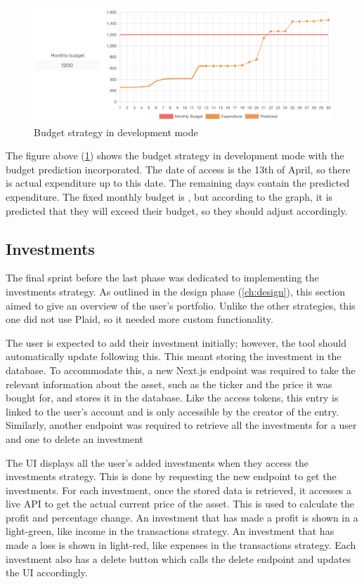 \begin{figure}[H]
	\centering
	\includegraphics[width=\textwidth]{images/Budget_strategy.png}
	\caption{Budget strategy in development mode}
	\label{fig:BudgetStrategy}
\end{figure}

The figure above (\ref{fig:BudgetStrategy}) shows the budget strategy in development mode with the budget prediction incorporated. The date of access is the 13th of April, so there is actual expenditure up to this date. The remaining days contain the predicted expenditure. The fixed monthly budget is , but according to the graph, it is predicted that they will exceed their budget, so they should adjust accordingly.

\subsection{Investments}
The final sprint before the last phase was dedicated to implementing the investments strategy. As outlined in the design phase (\ref{ch:design}), this section aimed to give an overview of the user's portfolio. Unlike the other strategies, this one did not use Plaid, so it needed more custom functionality. 

The user is expected to add their investment initially; however, the tool should automatically update following this. This meant storing the investment in the database. To accommodate this, a new Next.js endpoint was required to take the relevant information about the asset, such as the ticker and the price it was bought for, and stores it in the database. Like the access tokens, this entry is linked to the user's account and is only accessible by the creator of the entry. Similarly, another endpoint was required to retrieve all the investments for a user and one to delete an investment

The UI displays all the user's added investments when they access the investments strategy. This is done by requesting the new endpoint to get the investments. For each investment, once the stored data is retrieved, it accesses a live API to get the actual current price of the asset. This is used to calculate the profit and percentage change. An investment that has made a profit is shown in a light-green, like income in the transactions strategy. An investment that has made a loss is shown in light-red, like expenses in the transactions strategy. Each investment also has a delete button which calls the delete endpoint and updates the UI accordingly.

